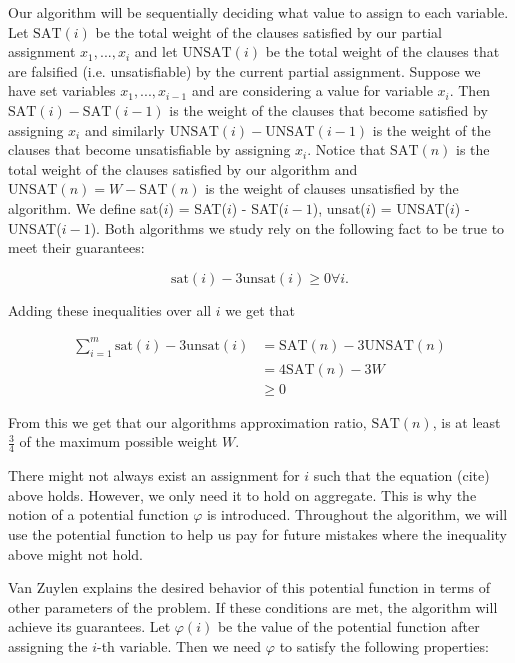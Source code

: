 \documentclass[11pt,letter]{article}
\numberwithin{theorem}{section}
\renewcommand{\phi}{\varphi}
\begin{document}
Our algorithm will be sequentially deciding what value to assign to each variable. Let $\mathrm{SAT}(i)$ be the total weight of the clauses
satisfied by our partial assignment $x_1, ..., x_i$ and let $\mathrm{UNSAT}(i)$ be the total weight of the clauses that are falsified (i.e. unsatisfiable) by the current partial assignment.
Suppose we have set variables $x_1,...,x_{i-1}$ and are considering a value for variable $x_i$. Then $\mathrm{SAT}(i)-\mathrm{SAT}(i-1)$ is the weight
of the clauses that become satisfied by assigning $x_i$ and similarly $\mathrm{UNSAT}(i) - \mathrm{UNSAT}(i-1)$ is the weight of the clauses that become
unsatisfiable by assigning $x_i$.
Notice that $\mathrm{SAT}(n)$ is the total weight of the clauses satisfied by our algorithm and $\mathrm{UNSAT}(n) = W - \mathrm{SAT}(n)$ is the weight of clauses
unsatisfied by the algorithm. We define sat($i$) = SAT($i$) - SAT($i-1$), unsat($i$) = UNSAT($i$) - UNSAT($i-1$). Both algorithms we study rely on the following fact to be true to meet their guarantees:

\begin{equation}
\label{eq:1}
\mathrm{sat}(i) - 3\mathrm{unsat}(i) \geq 0 \forall i.
\end{equation}

Adding these inequalities over all $i$ we get that

\begin{equation*}
\begin{aligned}
\sum_{i = 1}^{m} \mathrm{sat}(i) - 3\mathrm{unsat}(i) & = \mathrm{SAT}(n) - 3\mathrm{UNSAT}(n) \\
& = 4\mathrm{SAT}(n) - 3W \\
& \geq 0
\end{aligned}
\end{equation*}

From this we get that our algorithms approximation ratio, $\textrm{SAT}(n)$, is at least $\frac{3}{4}$ of the maximum possible weight $W$.

There might not always exist an assignment for $i$ such that the equation (cite) above holds. However, we only need it to hold on aggregate.
This is why the notion of a potential function $\phi$ is introduced. Throughout the algorithm, we will use the potential function to help us pay
for future mistakes where the inequality above might not hold.

Van Zuylen explains the desired behavior of this potential function in terms of other parameters of the problem. If these conditions are met, the algorithm
will achieve its guarantees. Let $\phi(i)$ be the value of the potential function after assigning the $i$-th variable. Then we need $\phi$ to satisfy the following properties:
\end{document}
